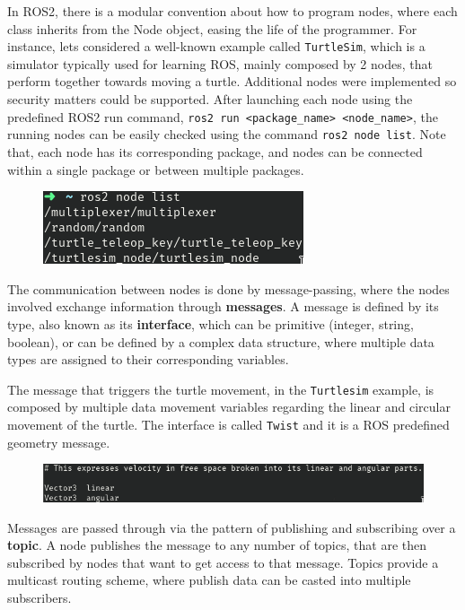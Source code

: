 In ROS2, there is a modular convention about how to program nodes, where each class inherits from the Node object, easing the life of the programmer.        
For instance, lets considered a well-known example called \texttt{TurtleSim}, which is a simulator typically used for learning ROS, mainly composed by 2 nodes, that perform together towards moving a turtle. Additional nodes were implemented so security matters could be supported. After launching each node using the predefined ROS2 run command, \texttt{ros2 run <package\_name> <node\_name>}, the running nodes can be easily checked using the command \texttt{ros2 node list}. Note that, each node has its corresponding package, and nodes can be connected within a single package or between multiple packages.

\begin{figure}[H]
        \centering
         \includegraphics[width=0.4\linewidth]{images/ts_nodelist.png}
\end{figure}
    
The communication between nodes is done by message-passing, where the nodes involved exchange information through \textbf{messages}. A message is defined by its type, also known as its \textbf{interface}, which can be primitive (integer, string, boolean), or can be defined by a complex data structure, where multiple data types are assigned to their corresponding variables.

The message that triggers the turtle movement, in the \texttt{Turtlesim} example, is composed by multiple data movement variables regarding the linear and circular movement of the turtle. The interface is called \texttt{Twist} and it is a ROS predefined geometry message.

\begin{figure}[H]
        \centering
         \includegraphics[width=0.7\linewidth]{images/ts_interface_twist.png}
\end{figure}
            
Messages are passed through via the pattern of publishing and subscribing over a \textbf{topic}. A node publishes the message to any number of topics, that are then subscribed by nodes that want to get access to that message. Topics provide a multicast routing scheme, where publish data can be casted into multiple subscribers.

